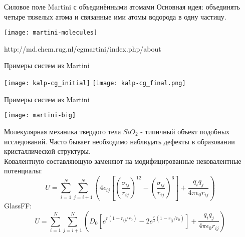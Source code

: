 \begin{frame}{Силовое поле Martini с объединёнными атомами }
        Основная идея: объединять четыре тяжелых атома и связанные ими атомы
    водорода в одну частицу. 
    \\
    \begin{center}
      \texttt{[image: martini-molecules]}
    \end{center}
    
    \footnotesize{http://md.chem.rug.nl/cgmartini/index.php/about}

\end{frame}

\begin{frame}{Примеры систем из Martini}
    \begin{center}

      \texttt{[image: kalp-cg\_initial]}
      \texttt{[image: kalp-cg\_final.png]}\\


    \end{center}

    \end{frame}   
\begin{frame}{Примеры систем из Martini}
    \begin{center}

      \texttt{[image: martini-big]}


    \end{center}
\end{frame}


\begin{frame}{Молекулярная механика твердого тела}
	$SiO_2$ - типичный объект подобных исследований. Часто бывает необходимо наблюдать дефекты в образовании кристаллической структуры.\\
	Ковалентную составляющую заменяют на модифицированные нековалентные потенциалы:
	\[ U= \sum_{i=1}^N \sum_{j=i+1}^N  \left (   4 \epsilon_{ij} \left [ \left ( \frac{\sigma_{ij}}{r_{ij}} \right )^{12} - \left ( \frac{\sigma_{ij}}{r_{ij}} \right )^6  \right ] + 
	\frac{q_i q_j}{ 4\pi \epsilon_0 r_{ij}} \right ) \]
	GlassFF:
	\[ U= \sum_{i=1}^N \sum_{j=i+1}^N \left( D_0 \left [ e^{{r(1-r_{ij}/r_0)}}  -2 e^{ \frac{r}{2}(1-r_{ij}/r_0)} \right ] + \frac{q_i q_j}{ 4\pi \epsilon_0 r_{ij}} \right ) 
	\]
\end{frame}



